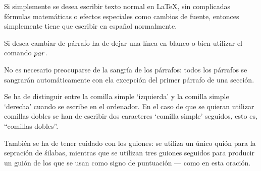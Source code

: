 \documentclass[a4paper,10pt]{letter}
\begin{document}
 Si simplemente se desea escribir texto normal en LaTeX,
 sin complicadas f\'ormulas matem\'aticas o efectos especiales
 como cambios de fuente, entonces simplemente tiene que escribir
 en espa\~nol normalmente.\par
 Si desea cambiar de párrafo ha de dejar una línea en blanco o bien
utilizar el comando $\\par$.

 No es necesario preocuparse de la sangría de los párrafos:
 todos los párrafos se sangrarán automáticamente con ela excepción
 del primer párrafo de una sección.
 
 Se ha de distinguir entre la comilla simple `izquierda'
 y la comilla simple `derecha' cuando se escribe en el ordenador.
 En el caso de que se quieran utilizar comillas dobles se han de
 escribir dos caracteres `comilla simple' seguidos, esto es,
 ``comillas dobles''.
 
 También se ha de tener cuidado con los guiones: se utiliza un único
 quión para la sepración de śilabas, mientras que se utilizan
 tres guiones seguidos para producir un guión de los que se usan
 como signo de puntuación --- como en esta oración.
 
\end{document}
